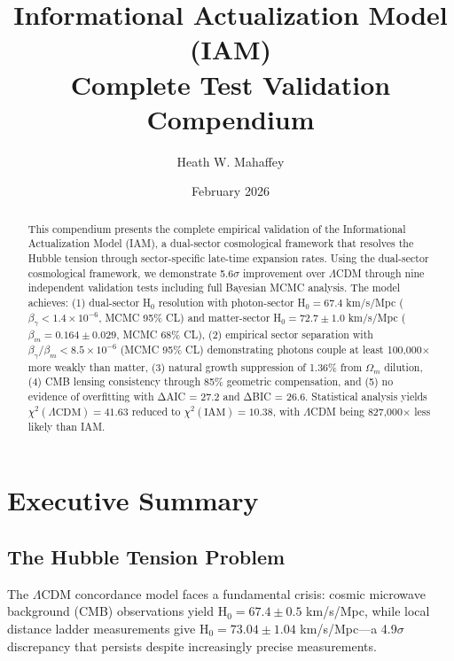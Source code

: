 \documentclass[11pt,letterpaper]{article}
\title{\textbf{Informational Actualization Model (IAM)\\Complete Test Validation Compendium}}
\author{Heath W. Mahaffey}
\date{February 2026}
\begin{document}
\maketitle

\begin{abstract}
This compendium presents the complete empirical validation of the Informational Actualization Model (IAM), a dual-sector cosmological framework that resolves the Hubble tension through sector-specific late-time expansion rates. Using the dual-sector cosmological framework, we demonstrate 5.6$\sigma$ improvement over $\Lambda$CDM through nine independent validation tests including full Bayesian MCMC analysis. The model achieves: (1) dual-sector H$_0$ resolution with photon-sector H$_0 = 67.4$ km/s/Mpc ($\beta_\gamma < 1.4 \times 10^{-6}$, MCMC 95\% CL) and matter-sector H$_0 = 72.7 \pm 1.0$ km/s/Mpc ($\beta_m = 0.164 \pm 0.029$, MCMC 68\% CL), (2) empirical sector separation with $\beta_\gamma/\beta_m < 8.5 \times 10^{-6}$ (MCMC 95\% CL) demonstrating photons couple at least 100,000$\times$ more weakly than matter, (3) natural growth suppression of 1.36\% from $\Omega_m$ dilution, (4) CMB lensing consistency through 85\% geometric compensation, and (5) no evidence of overfitting with ΔAIC = 27.2 and ΔBIC = 26.6. Statistical analysis yields $\chi^2(\Lambda\text{CDM}) = 41.63$ reduced to $\chi^2(\text{IAM}) = 10.38$, with $\Lambda$CDM being 827,000$\times$ less likely than IAM.
\end{abstract}

\tableofcontents
\newpage

\section{Executive Summary}

\subsection{The Hubble Tension Problem}

The $\Lambda$CDM concordance model faces a fundamental crisis: cosmic microwave background (CMB) observations yield H$_0 = 67.4 \pm 0.5$ km/s/Mpc, while local distance ladder measurements give H$_0 = 73.04 \pm 1.04$ km/s/Mpc—a 4.9$\sigma$ discrepancy that persists despite increasingly precise measurements.
\end{document}
